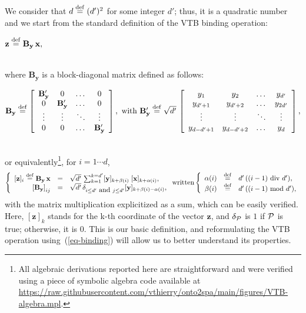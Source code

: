 \documentclass[sn-mathphys]{sn-jnl}
\newcommand{\defq}{\stackrel {\rm def}{=}}
\newcommand{\eqline}[1]{~\vspace{0.1cm}\\\centerline{$#1$}\vspace{0.1cm}\\}
\begin{document}
\begin{appendices}
We consider that $d \defq (d')^2$ for some integer $d'$; thus, it is a quadratic number and we start from the standard definition of the VTB binding operation:
\eqline{\mathbf{z} \defq \mathbf{B_y} \, \mathbf{x},}
where $\mathbf{B_y}$ is a block-diagonal matrix defined as follows:
\eqline{\mathbf{B_y} \defq 
\left[\begin{array}{cccc}
    \mathbf{B_y'} &    0 & \dots &   0 \\
       0 & \mathbf{B_y'} & \dots &    0 \\
    \vdots & \vdots & \ddots & \vdots  \\
       0 &    0 & \dots & \mathbf{B_y'}
    \end{array}\right],
\mbox{ with } 
\mathbf{B_y'}  \defq \sqrt{d'} \,
\left[\begin{array}{cccc}
    y_1            & y_2            & \dots  & y_{d'}  \\
    y_{d' + 1}     & y_{d' + 2}     & \dots  & y_{2d'} \\
    \vdots         & \vdots         & \ddots & \vdots  \\
    y_{d - d' + 1} & y_{d - d' + 2} & \dots  & y_d
\end{array}\right],}
or equivalently\footnote{All algebraic derivations reported here are straightforward and were verified using a piece of symbolic algebra code available at \url{https://raw.githubusercontent.com/vthierry/onto2spa/main/figures/VTB-algebra.mpl}.}, for $i = 1 \cdots d$,
\begin{equation}\label{eq-binding}
  \left\{\begin{array}{rcl}
      [\mathbf{z}]_i \defq \mathbf{B_y} \, \mathbf{x} &=& \sqrt{d'} \, \sum_{k = 1}^{k = d'} [\mathbf{y}]_{k + \beta(i)} \; [\mathbf{x}]_{k + \alpha(i)}, \\
      \left[\mathbf{B_y}\right]_{ij} &=& \sqrt{d'} \, \delta_{i \le d' \mbox{ and } j \le d'} [\mathbf{y}]_{k + \beta(i) - \alpha(i)}, \\
  \end{array}\right.
\mbox{written} \left\{\begin{array}{rcl} 
  \alpha(i) &\defq& d' \, ((i-1) \mbox{ div } d'), \\
  \beta(i)  &\defq& d' \, ((i-1) \mbox{ mod } d'), \\
\end{array}\right.
\end{equation}
with the matrix multiplication explicitized as a sum, which can be easily verified. Here, $[\mathbf{z}]_k$ stands for the k-th coordinate of the vector $\mathbf{z}$, and $\delta_{\cal P}$ is $1$ if ${\cal P}$ is true; otherwise, it is $0$. This is our basic definition, and reformulating the VTB operation using~(\ref{eq-binding}) will allow us to better understand its properties.


\end{appendices}
\end{document}

